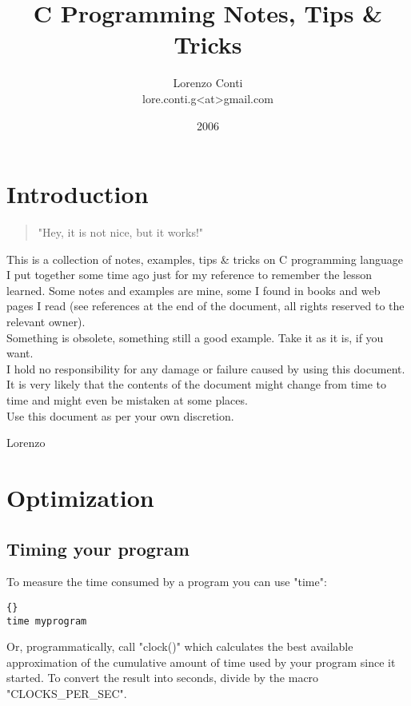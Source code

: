 \documentclass{report}
\begin{document}
\title{C Programming Notes, Tips \& Tricks}
\author{Lorenzo Conti \\ lore.conti.g<at>gmail.com } 
\date{2006}

\maketitle
\tableofcontents


\chapter{Introduction}

\begin{quote}
"Hey, it is not nice, but it works!"
\end{quote}

This is a collection of notes, examples, tips \& tricks on C programming language I put together some time ago just for my reference to remember the lesson learned.
Some notes and examples are mine, some I found in books and web pages I read (see references at the end of the document, all rights reserved to the relevant owner). \\
Something is obsolete, something still a good example. Take it as it is, if you want. \\
I hold no responsibility for any damage or failure caused by using this document. It is very likely that the contents of the document might change from time to time and might even be mistaken at some places. \\
Use this document as per your own discretion.

\hfill Lorenzo

\chapter{Optimization}

\section{Timing your program}
To measure the time consumed by a program you can use "time":
\begin{lstlisting}{}
time myprogram
\end{lstlisting}
Or, programmatically, call "clock()" which calculates the best available approximation of the cumulative amount of time used by your program since it started. To convert the result into seconds, divide by the macro "CLOCKS\_PER\_SEC".
\end{document}
